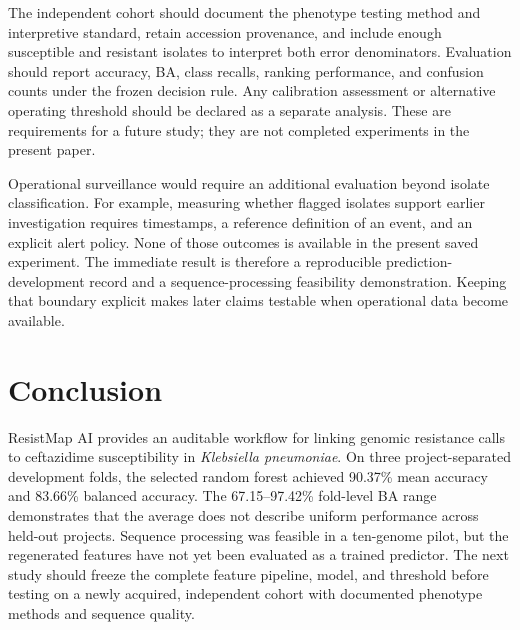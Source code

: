 \documentclass[conference]{IEEEtran}
\newcommand{\kp}{\textit{Klebsiella pneumoniae}}
\begin{document}
The independent cohort should document the phenotype testing method and interpretive standard, retain accession provenance, and include enough susceptible and resistant isolates to interpret both error denominators. Evaluation should report accuracy, BA, class recalls, ranking performance, and confusion counts under the frozen decision rule. Any calibration assessment or alternative operating threshold should be declared as a separate analysis. These are requirements for a future study; they are not completed experiments in the present paper.

Operational surveillance would require an additional evaluation beyond isolate classification. For example, measuring whether flagged isolates support earlier investigation requires timestamps, a reference definition of an event, and an explicit alert policy. None of those outcomes is available in the present saved experiment. The immediate result is therefore a reproducible prediction-development record and a sequence-processing feasibility demonstration. Keeping that boundary explicit makes later claims testable when operational data become available.


\section{Conclusion}
ResistMap AI provides an auditable workflow for linking genomic resistance calls to ceftazidime susceptibility in \kp{}. On three project-separated development folds, the selected random forest achieved 90.37\% mean accuracy and 83.66\% balanced accuracy. The 67.15--97.42\% fold-level BA range demonstrates that the average does not describe uniform performance across held-out projects. Sequence processing was feasible in a ten-genome pilot, but the regenerated features have not yet been evaluated as a trained predictor. The next study should freeze the complete feature pipeline, model, and threshold before testing on a newly acquired, independent cohort with documented phenotype methods and sequence quality.
\end{document}
